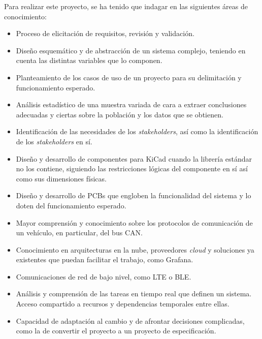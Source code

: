 Para realizar este proyecto, se ha tenido que indagar en las siguientes áreas de
conocimiento:

\begin{itemize}
  \item Proceso de elicitación de requisitos, revisión y validación.
  \item Diseño esquemático y de abstracción de un sistema complejo,
        teniendo en cuenta las distintas variables que lo componen.
  \item Planteamiento de los casos de uso de un proyecto para
        su delimitación y funcionamiento esperado.
  \item Análisis estadístico de una muestra variada de cara a extraer
        conclusiones adecuadas y ciertas sobre la población y los
        datos que se obtienen.
  \item Identificación de las necesidades de los \textit{stakeholders},
        así como la identificación de los \textit{stakeholders} en sí.
  \item Diseño y desarrollo de componentes para KiCad cuando la librería
        estándar no los contiene, siguiendo las restricciones lógicas del
        componente en sí así como sus dimensiones físicas.
  \item Diseño y desarrollo de PCBs que engloben la funcionalidad del
        sistema y lo doten del funcionamiento esperado.
  \item Mayor comprensión y conocimiento sobre los protocolos de
        comunicación de un vehículo, en particular, del bus \ac{CAN}.
  \item Conocimiento en arquitecturas en la nube, proveedores \textit{cloud}
        y soluciones ya existentes que puedan facilitar el trabajo, como
        Grafana.
  \item Comunicaciones de red de bajo nivel, como \ac{LTE} o \ac{BLE}.
  \item Análisis y comprensión de las tareas en tiempo real que definen
        un sistema. Acceso compartido a recursos y dependencias temporales
        entre ellas.
  \item Capacidad de adaptación al cambio y de afrontar decisiones complicadas,
        como la de convertir el proyecto a un proyecto de especificación.
\end{itemize}
